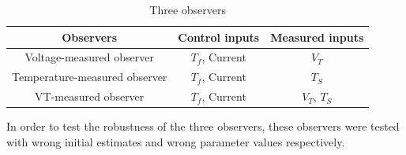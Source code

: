 \documentclass[12pt]{article}
\begin{document}
\begin{table}[H]
	\caption{Three observers}
	\vspace{-0.4cm}
	\label{tb:3obs}
	\centering
	\begin{tabular}{ccc}
		\hline
		\textbf{Observers}&\textbf{Control inputs}&\textbf{Measured inputs}\\
		\hline
		Voltage-measured observer&$T_f$, Current&$V_T$ \\
		Temperature-measured observer&$T_f$, Current&$T_S$\\
		VT-measured observer&$T_f$, Current&$V_T$, $T_S$\\
		\hline
	\end{tabular}
\end{table}
In order to test the robustness of the three observers, these observers were tested with wrong initial estimates and wrong parameter values respectively. 
\end{document}
